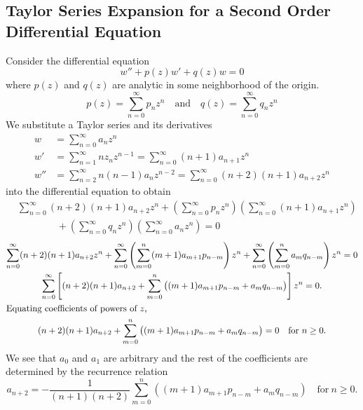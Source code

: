 \subsection{Taylor Series Expansion for a Second Order Differential Equation}
Consider the differential equation
\[ w'' + p(z) w' + q(z) w = 0\]
where $p(z)$ and $q(z)$ are analytic in some neighborhood of the origin.
\[ p(z) = \sum_{n=0}^\infty p_n z^n \quad \mathrm{and} \quad
q(z) = \sum_{n=0}^\infty q_n z^n \]
We substitute a Taylor series and its derivatives
\begin{align*}
  w       &= \sum_{n=0}^\infty a_n z^n \\
  w'      &= \sum_{n=1}^\infty n z_n z^{n-1} = \sum_{n=0}^\infty (n+1) a_{n+1} z^n \\
  w''     &= \sum_{n=2}^\infty n(n-1)a_n z^{n-2}
  = \sum_{n=0}^\infty (n+2)(n+1)a_{n+2}z^n 
\end{align*}
into the differential equation to obtain
\begin{align*}
  &\sum_{n=0}^\infty (n+2)(n+1) a_{n+2} z^n + \left(\sum_{n=0}^\infty p_n z^n \right)
  \left(\sum_{n=0}^\infty (n+1) a_{n+1} z^n \right) \\
  &\qquad \qquad + \left(\sum_{n=0}^\infty q_n z^n \right)
  \left(\sum_{n=0}^\infty a_n z^n \right) = 0 
\end{align*}
\begin{gather*}
  \sum_{n=0}^\infty (n+2)(n+1) a_{n+2} z^n 
  + \sum_{n=0}^\infty \left(\sum_{m=0}^n (m+1)a_{m+1}p_{n-m} \right) z^n
  + \sum_{n=0}^\infty \left(\sum_{m=0}^n a_m q_{n-m} \right) z^n = 0 \\
  \sum_{n=0}^\infty \left[ (n+2)(n+1) a_{n+2} + \sum_{m=0}^n \big( 
    (m+1)a_{m+1}p_{n-m} + a_m q_{n-m} \big) \right] z^n = 0. \\
  \intertext{Equating coefficients of powers of $z$,}
  (n+2)(n+1) a_{n+2} + \sum_{m=0}^n 
  \big((m+1)a_{m+1}p_{n-m} + a_m q_{n-m} \big) = 0 \quad 
  \mathrm{for}\ n \geq 0.
\end{gather*}
We see that $a_0$ and $a_1$ are arbitrary and the rest of the 
coefficients are determined by the recurrence relation
\[ a_{n+2} = -\frac{1}{(n+1)(n+2)} \sum_{m=0}^n 
\left((m+1)a_{m+1}p_{n-m} + a_m q_{n-m} \right) \quad 
\mathrm{for}\ n \geq 0. \]




